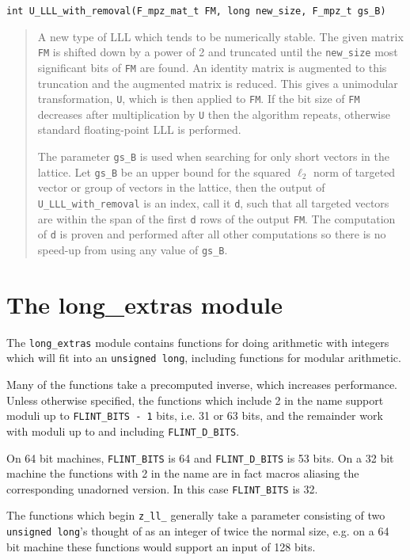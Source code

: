 \documentclass[a4paper,10pt]{article}
\newcommand{\code}{\lstinline}
\begin{document}
\begin{lstlisting}
int U_LLL_with_removal(F_mpz_mat_t FM, long new_size, F_mpz_t gs_B)
\end{lstlisting}

\begin{quote}
A new type of LLL which tends to be numerically stable.  The given matrix \code{FM} is shifted down by a power of 2
and truncated until the \code{new_size} most significant bits of \code{FM} are found.  An identity matrix is augmented to this 
truncation and the augmented matrix is reduced.  This gives a unimodular transformation, \code{U}, which is then applied to 
\code{FM}.  If the bit size of \code{FM} decreases after multiplication by \code{U} then the algorithm repeats, 
otherwise standard floating-point LLL is performed.

The parameter \code{gs_B} is used when searching for only short vectors in the lattice.  Let \code{gs_B} be an upper bound for 
the squared $\ell_2$ norm of targeted vector or group of vectors in the lattice, then the output of \code{U_LLL_with_removal} is 
an index, call it \code{d}, such that all targeted vectors are within the span of the first \code{d} rows of the output \code{FM}.  
The computation of \code{d} is proven and performed after all other computations so there is no speed-up from using any value 
of \code{gs_B}.
\end{quote}

\section{The long\_extras module}
The \code{long_extras} module contains functions for doing arithmetic with integers which will fit into an \code{unsigned long}, including functions for modular arithmetic.

Many of the functions take a precomputed inverse, which increases performance. Unless otherwise specified, the functions which include 2 in the name support moduli up to \code{FLINT_BITS - 1} bits, i.e. 31 or 63 bits, and the remainder work with moduli up to and including \code{FLINT_D_BITS}. 

On 64 bit machines, \code{FLINT_BITS} is 64 and \code{FLINT_D_BITS} is 53 bits. On a 32 bit machine the functions with 2 in the name are in fact macros aliasing the corresponding unadorned version. In this case \code{FLINT_BITS} is 32.

The functions which begin \code{z_ll_} generally take a parameter consisting of two \code{unsigned long}'s thought of as an integer of twice the normal size, e.g. on a 64 bit machine these functions would support an input of 128 bits.
\end{document}
